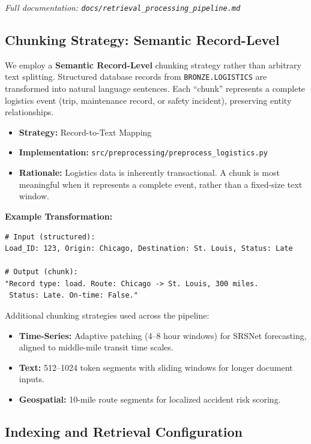 \documentclass[14.5pt,letterpaper]{article}
\begin{document}
\noindent\textit{Full documentation: \texttt{docs/retrieval\_processing\_pipeline.md}}

\subsection{Chunking Strategy: Semantic Record-Level}

We employ a \textbf{Semantic Record-Level} chunking strategy rather than arbitrary text splitting. Structured database records from \texttt{BRONZE.LOGISTICS} are transformed into natural language sentences. Each ``chunk'' represents a complete logistics event (trip, maintenance record, or safety incident), preserving entity relationships.

\begin{itemize}
    \item \textbf{Strategy:} Record-to-Text Mapping
    \item \textbf{Implementation:} \texttt{src/preprocessing/preprocess\_logistics.py}
    \item \textbf{Rationale:} Logistics data is inherently transactional. A chunk is most meaningful when it represents a complete event, rather than a fixed-size text window.
\end{itemize}

\textbf{Example Transformation:}
\begin{lstlisting}[caption={Semantic chunking: structured data to natural language}]
# Input (structured):
Load_ID: 123, Origin: Chicago, Destination: St. Louis, Status: Late

# Output (chunk):
"Record type: load. Route: Chicago -> St. Louis, 300 miles.
 Status: Late. On-time: False."
\end{lstlisting}

Additional chunking strategies used across the pipeline:
\begin{itemize}
    \item \textbf{Time-Series:} Adaptive patching (4--8 hour windows) for SRSNet forecasting, aligned to middle-mile transit time scales.
    \item \textbf{Text:} 512--1024 token segments with sliding windows for longer document inputs.
    \item \textbf{Geospatial:} 10-mile route segments for localized accident risk scoring.
\end{itemize}

\subsection{Indexing and Retrieval Configuration}
\end{document}
